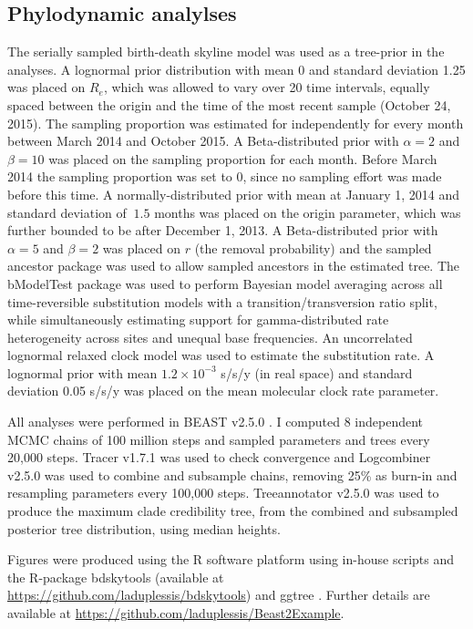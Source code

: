 \subsection{Phylodynamic analylses}

	The serially sampled birth-death skyline model \citep{stadler2013birth} was used as a tree-prior in the analyses. 
	A lognormal prior distribution with mean 0 and standard deviation 1.25 was placed on $R_e$, which was allowed to vary over 20 time intervals, equally spaced between the origin and the time of the most recent sample (October 24, 2015). 
	The sampling proportion was estimated for independently for every month between March 2014 and October 2015. A Beta-distributed prior with $\alpha = 2$ and $\beta = 10$ was placed on the sampling proportion for each month. Before March 2014 the sampling proportion was set to 0, since no sampling effort was made before this time.
	A normally-distributed prior with mean at January 1, 2014 and standard deviation of $~1.5$ months was placed on the origin parameter, which was further bounded to be after December 1, 2013. 
	A Beta-distributed prior with $\alpha = 5$ and $\beta = 2$ was placed on $r$ (the removal probability) and the sampled ancestor package \citep{gavryushkina2014bayesian} was used to allow sampled ancestors in the estimated tree. 
	The bModelTest \citep{bouckaert2017bmodeltest} package was used to perform Bayesian model averaging across all time-reversible substitution models with a transition/transversion ratio split, while simultaneously estimating support for gamma-distributed rate heterogeneity across sites and unequal base frequencies. 
	An uncorrelated lognormal relaxed clock model \citep{drummond2006} was used to estimate the substitution rate. A lognormal prior with mean $1.2 \times 10^{-3}$ s/s/y (in real space) and standard deviation 0.05 s/s/y was placed on the mean molecular clock rate parameter. 

	All analyses were performed in BEAST v2.5.0 \citep{bouckaert2014beast}. 
	I computed 8 independent MCMC chains of 100 million steps and sampled parameters and trees every 20,000 steps. 
	Tracer v1.7.1 \citep{Rambaut2018Tracer} was used to check convergence and Logcombiner v2.5.0 was used to combine and subsample chains, removing 25\% as burn-in and resampling parameters every 100,000 steps. 
	Treeannotator v2.5.0 was used to produce the maximum clade credibility tree, from the combined and subsampled posterior tree distribution, using median heights. 

	Figures were produced using the R software platform using in-house scripts and the R-package bdskytools (available at \url{https://github.com/laduplessis/bdskytools}) and ggtree \citep{Yu2017}. 
	Further details are available at \url{https://github.com/laduplessis/Beast2Example}.


